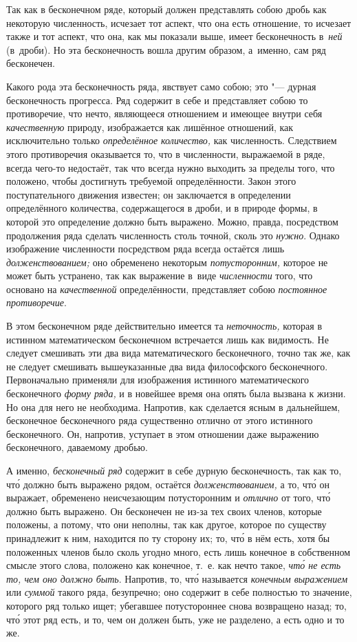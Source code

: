 Так как в бесконечном ряде, который должен представлять собою дробь как
некоторую численность, исчезает тот аспект, что она есть отношение, то исчезает
также и тот аспект, что она, как мы показали выше, имеет бесконечность
в~{\em ней} (в~дроби). Но эта бесконечность вошла другим образом, а~именно,
сам ряд бесконечен.

Какого рода эта бесконечность ряда, явствует само собою; это "--- дурная
бесконечность прогресса. Ряд содержит в себе и представляет собою то
противоречие, что нечто, являющееся отношением и имеющее внутри себя
{\em качественную} природу, изображается как лишённое отношений, как
исключительно только {\em определённое количество,} как численность. Следствием
этого противоречия оказывается то, что в численности, выражаемой в ряде, всегда
чего-то недостаёт, так что всегда нужно выходить за пределы того, что положено,
чтобы достигнуть требуемой определённости. Закон этого поступательного движения
известен; он заключается в определении определённого количества, содержащегося
в дроби, и в природе формы, в которой это определение должно быть выражено.
Можно, правда, посредством продолжения ряда сделать численность столь точной,
сколь это {\em нужно}. Однако изображение численности посредством ряда всегда
остаётся лишь {\em долженствованием;} оно обременено некоторым
{\em потусторонним,} которое не может быть устранено, так как выражение в~виде
{\em численности} того, что основано на {\em качественной} определённости,
представляет собою {\em постоянное противоречие}.

\label{bkm:bm52a}В этом бесконечном ряде действительно имеется та
{\em неточность,} которая в истинном математическом бесконечном встречается
лишь как видимость. Не следует смешивать эти два вида математического
бесконечного, точно так же, как не следует смешивать вышеуказанные два вида
философского бесконечного. Первоначально применяли для изображения истинного
математического бесконечного {\em форму ряда,} и в новейшее время она опять
была вызвана к жизни. Но она для него не необходима. Напротив, как сделается
ясным в дальнейшем, бесконечное бесконечного ряда существенно отлично от этого
истинного бесконечного. Он, напротив, уступает в этом отношении даже выражению
бесконечного, даваемому дробью.

А именно, {\em бесконечный ряд} содержит в себе дурную бесконечность, так как
то, чт\'{о} должно быть выражено рядом, остаётся {\em долженствованием,} а то,
чт\'{о} он выражает, обременено неисчезающим потусторонним и {\em отлично} от
того, чт\'{о} должно быть выражено. Он бесконечен не из-за тех своих членов,
которые положены, а потому, что они неполны, так как другое, которое по
существу принадлежит к ним, находится по ту сторону их; то, чт\'{о} в нём есть,
хотя бы положенных членов было сколь угодно много, есть лишь конечное в
собственном смысле этого слова, положено как конечное, т.~е. как нечто такое,
{\em чт\'{о} не есть то, чем оно должно быть}. Напротив, то, чт\'{о} называется
{\em конечным выражением} или {\em суммой} такого ряда, безупречно; оно
содержит в себе полностью то значение, которого ряд только ищет; убегавшее
потустороннее снова возвращено назад; то, чт\'{о} этот ряд есть, и то, чем он
должен быть, уже не разделено, а есть одно и то же.

